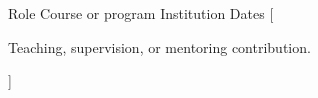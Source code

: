 

\begin{cventries}

  \cventry
    {Role} %
    {Course or program} %
    {Institution} %
    {Dates} %
    [
      \begin{cvitems}
        \item {Teaching, supervision, or mentoring contribution.}
      \end{cvitems}
    ]

\end{cventries}
